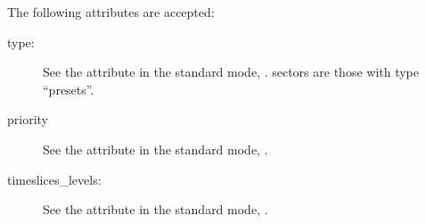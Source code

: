 \documentclass[letterpaper,10pt,english]{sphinxmanual}
\begin{document}
The following attributes are accepted:
\begin{description}
\item[{type:}] \leavevmode
See the attribute in the standard mode, {\hyperref[\detokenize{inputs/toml:sector-type}]{}}.  sectors
are those with type “presets”.

\item[{priority}] \leavevmode
See the attribute in the standard mode, {\hyperref[\detokenize{inputs/toml:sector-priority}]{}}.

\item[{timeslices\_levels:}] \leavevmode
See the attribute in the standard mode, {\hyperref[\detokenize{inputs/toml:timeslices}]{}}.

\end{description}
\end{document}
